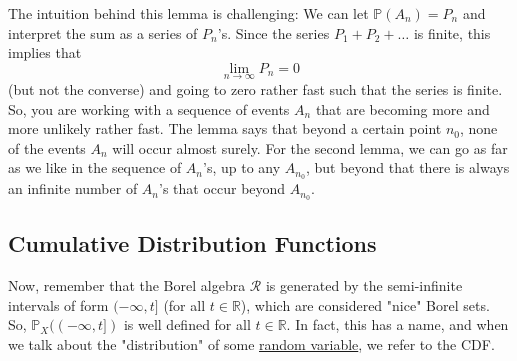   The intuition behind this lemma is challenging: We can let $\mathbb{P}(A_n) = P_n$ and interpret the sum as a series of $P_n$'s. Since the series $P_1 + P_2 + \ldots$ is finite, this implies that 
  \begin{equation}
    \lim_{n \rightarrow \infty} P_n = 0
  \end{equation}
  (but not the converse) and going to zero rather fast such that the series is finite. So, you are working with a sequence of events $A_n$ that are becoming more and more unlikely rather fast. The lemma says that beyond a certain point $n_0$, none of the events $A_n$ will occur almost surely. For the second lemma, we can go as far as we like in the sequence of $A_n$'s, up to any $A_{n_0}$, but beyond that there is always an infinite number of $A_n$'s that occur beyond $A_{n_0}$. 

\subsection{Cumulative Distribution Functions} 

  Now, remember that the Borel algebra $\mathcal{R}$ is generated by the semi-infinite intervals of form $(-\infty, t]$ (for all $t \in \mathbb{R}$), which are considered "nice" Borel sets. So, $\mathbb{P}_X( (-\infty, t])$ is well defined for all $t \in \mathbb{R}$. In fact, this has a name, and when we talk about the "distribution" of some \hyperref[def:random-variable]{random variable}, we refer to the CDF. 

